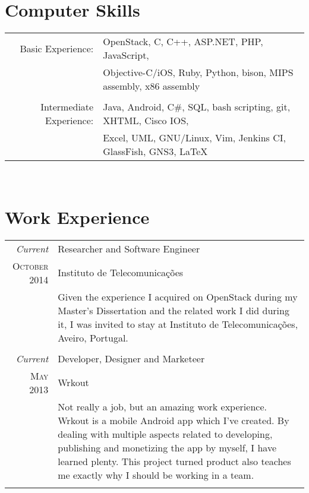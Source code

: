 \documentclass[a4paper,10pt]{article} %
\begin{document}

\section{Computer Skills}

\begin{tabular}{rl}
Basic Experience: & OpenStack, C, C++, ASP.NET, PHP, JavaScript,\\
& Objective-C/iOS, Ruby, Python, bison, MIPS assembly, x86 assembly\\
& \\

Intermediate Experience: & Java, Android, C\#, SQL, bash scripting, git, XHTML, Cisco IOS,\\
& Excel, UML, GNU/Linux, Vim, Jenkins CI, GlassFish, GNS3, {\LaTeX}\\
\end{tabular} \\


\section{Work Experience}

\begin{tabular}{r|p{11cm}}
	\emph{Current} & Researcher and Software Engineer \\
	\textsc{October 2014} & Instituto de Telecomunicações \\ 
	& \footnotesize{Given the experience I acquired on OpenStack during my Master's Dissertation and the related work I did during it, I was invited to stay at Instituto de Telecomunicações, Aveiro, Portugal.}\\
	\multicolumn{2}{c}{} \\
	
	\emph{Current} & Developer, Designer and Marketeer \\
	\textsc{May 2013} & Wrkout \\ 
	& \footnotesize{Not really a job, but an amazing work experience. Wrkout is a mobile Android app which I've created. By dealing with multiple aspects related to developing, publishing and monetizing the app by myself, I have learned plenty. This project turned product also teaches me exactly why I should be working in a team.}\\
	\multicolumn{2}{c}{}\\
	
\end{tabular}
\end{document}
